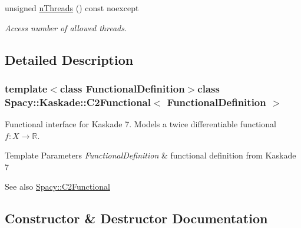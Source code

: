 \begin{DoxyCompactItemize}
\item 
\hypertarget{classSpacy_1_1Mixin_1_1NumberOfThreads_a385963b95b5e1ddf422393146cc71ee1}{}unsigned \hyperlink{classSpacy_1_1Mixin_1_1NumberOfThreads_a385963b95b5e1ddf422393146cc71ee1}{n\+Threads} () const noexcept\label{classSpacy_1_1Mixin_1_1NumberOfThreads_a385963b95b5e1ddf422393146cc71ee1}

\begin{DoxyCompactList}\small\item\em Access number of allowed threads. \end{DoxyCompactList}\end{DoxyCompactItemize}


\subsection{Detailed Description}
\subsubsection*{template$<$class Functional\+Definition$>$class Spacy\+::\+Kaskade\+::\+C2\+Functional$<$ Functional\+Definition $>$}

Functional interface for Kaskade 7. Models a twice differentiable functional $f:X\rightarrow \mathbb{R}$. 


\begin{DoxyTemplParams}{Template Parameters}
{\em Functional\+Definition} & functional definition from Kaskade 7 \\
\hline
\end{DoxyTemplParams}
\begin{DoxySeeAlso}{See also}
\hyperlink{classSpacy_1_1C2Functional}{Spacy\+::\+C2\+Functional} 
\end{DoxySeeAlso}


\subsection{Constructor \& Destructor Documentation}
\hypertarget{classSpacy_1_1Kaskade_1_1C2Functional_a35511ed1de0b2599efa901f27793dbdc}{}
